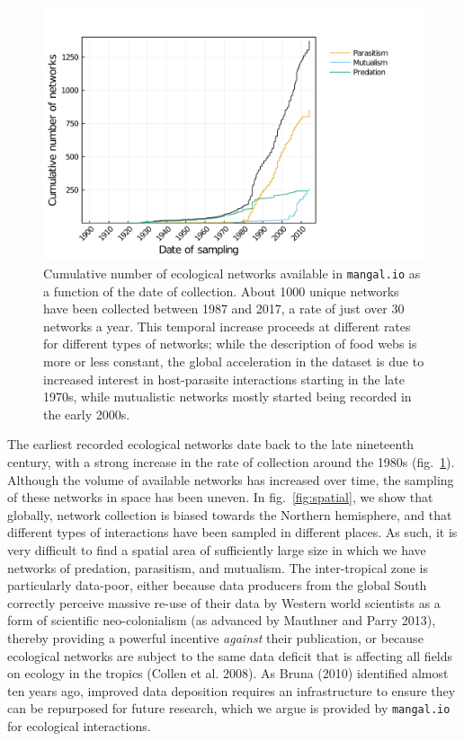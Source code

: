 \documentclass[11pt]{article}
\makeatletter
\def\maxwidth{\ifdim\Gin@nat@width>\linewidth\linewidth
\else\Gin@nat@width\fi}
\let\Oldincludegraphics\includegraphics
\renewcommand{\includegraphics}[1]{\Oldincludegraphics[width=\maxwidth]{#1}}
\makeatother
\begin{document}
\begin{figure}
\hypertarget{fig:temporal}{%
\centering
\includegraphics{figures/network_growth_over_time.png}
\caption{Cumulative number of ecological networks available in
\texttt{mangal.io} as a function of the date of collection. About 1000
unique networks have been collected between 1987 and 2017, a rate of
just over 30 networks a year. This temporal increase proceeds at
different rates for different types of networks; while the description
of food webs is more or less constant, the global acceleration in the
dataset is due to increased interest in host-parasite interactions
starting in the late 1970s, while mutualistic networks mostly started
being recorded in the early 2000s.}\label{fig:temporal}
}
\end{figure}

The earliest recorded ecological networks date back to the late
nineteenth century, with a strong increase in the rate of collection
around the 1980s (fig.~\ref{fig:temporal}). Although the volume of
available networks has increased over time, the sampling of these
networks in space has been uneven. In fig.~\ref{fig:spatial}, we show
that globally, network collection is biased towards the Northern
hemisphere, and that different types of interactions have been sampled
in different places. As such, it is very difficult to find a spatial
area of sufficiently large size in which we have networks of predation,
parasitism, and mutualism. The inter-tropical zone is particularly
data-poor, either because data producers from the global South correctly
perceive massive re-use of their data by Western world scientists as a
form of scientific neo-colonialism (as advanced by Mauthner and Parry
2013), thereby providing a powerful incentive \emph{against} their
publication, or because ecological networks are subject to the same data
deficit that is affecting all fields on ecology in the tropics (Collen
et al. 2008). As Bruna (2010) identified almost ten years ago, improved
data deposition requires an infrastructure to ensure they can be
repurposed for future research, which we argue is provided by
\texttt{mangal.io} for ecological interactions.
\end{document}
